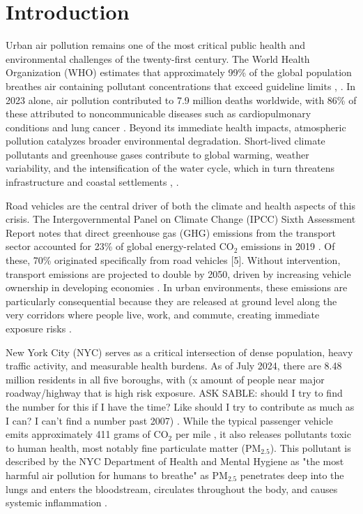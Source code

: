 \section{Introduction}

Urban air pollution remains one of the most critical public health and 
environmental challenges of the twenty-first century. The World Health 
Organization (WHO) estimates that approximately 99\% of the global population 
breathes air containing pollutant concentrations that exceed guideline limits 
\cite{world_health_organization_air_nodate}, \cite{health_effects_institute_state_2025}. In 2023 alone, air pollution contributed to 7.9 million deaths
worldwide, with 86\% of these attributed to noncommunicable diseases such as 
cardiopulmonary conditions and lung cancer \cite{health_effects_institute_state_2025}. Beyond its immediate health 
impacts, atmospheric pollution catalyzes broader environmental degradation. 
Short-lived climate pollutants and greenhouse gases contribute to global 
warming, weather variability, and the intensification of the water cycle, 
which in turn threatens infrastructure and coastal settlements \cite{uherek_transport_2010}, \cite{irankunda_systematic_2025}.

Road vehicles are the central driver of both the climate and health aspects of 
this crisis. The Intergovernmental Panel on Climate Change (IPCC) Sixth 
Assessment Report notes that direct greenhouse gas (GHG) emissions from the 
transport sector accounted for 23\% of global energy-related $\mathrm{CO_2}$ emissions in 
2019 \cite{ipcc_climate_2022}. Of these, 70\% originated specifically from road vehicles [5]. 
Without intervention, transport emissions are projected to double by 2050, 
driven by increasing vehicle ownership in developing economies \cite{creutzig_transport_2015}. In urban 
environments, these emissions are particularly consequential because they are 
released at ground level along the very corridors where people live, work, and 
commute, creating immediate exposure risks \cite{uherek_transport_2010}.

New York City (NYC) serves as a critical intersection of dense population, 
heavy traffic activity, and measurable health burdens. As of July 2024, there 
are 8.48 million residents in all five boroughs, with (x amount of people near
major roadway/highway that is high risk exposure. ASK SABLE: should I try to 
find the number for this if I have the time? Like should I try to contribute 
as much as I can? I can’t find a number past 2007) \cite{nyc_department_of_city_planning_population_2024}. While the typical passenger
vehicle emits approximately 411 grams of $\mathrm{CO_2}$ per mile \cite{us_epa_greenhouse_2016}, it also releases 
pollutants toxic to human health, most notably fine particulate matter ($\mathrm{PM_{2.5}}$).
This pollutant is described by the NYC Department of Health and Mental Hygiene 
as "the most harmful air pollution for humans to breathe" as $\mathrm{PM_{2.5}}$ penetrates 
deep into the lungs and enters the bloodstream, circulates throughout the body,
and causes systemic inflammation \cite{nyc_department_of_health_and_mental_hygiene_traffic_nodate}.

